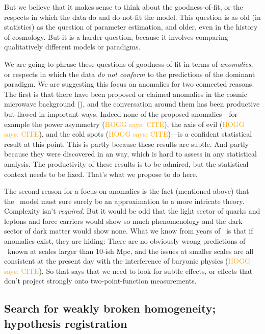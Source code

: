 \documentclass[12pt, fullpage, letterpaper]{article}
\newcommand{\HOGG}[1]{\textcolor{orange}{HOGG says: #1}}
\begin{document}
But we believe that it makes sense to think about the goodness-of-fit,
or the respects in which the data do and do not fit the model.
This question is as old (in statistics) as the question of parameter
estimation, and older, even in the history of cosmology.
But it is a harder question, because it involves comparing
qualitatively different models or paradigms.

We are going to phrase these questions of goodness-of-fit in terms of
\emph{anomalies}, or respects in which the data \emph{do not conform}
to the predictions of the dominant paradigm.
We are suggesting this focus on anomalies for two connected reasons.
The first is that there have been proposed or claimed anomalies in the
cosmic microwave background (\CMB), and the conversation around them has been
productive but flawed in important ways.
Indeed none of the proposed anomalies---for example the power
asymmetry (\HOGG{CITE}), the axis of evil (\HOGG{CITE}), and the cold
spots (\HOGG{CITE})---is a confident statistical result at this point.
This is partly because these results are subtle. And partly because
they were discovered in an  way, which is hard to
assess in any  statistical analysis.
The productivity of these results is to be admired, but the statistical
context needs to be fixed. That's what we propose to do here.

The second reason for a focus on anomalies is the fact (mentioned
above) that the \LCDM\ model must sure surely be an approximation to a
more intricate theory.
Complexity isn't \emph{required}.
But it would be odd that the light sector of quarks and leptons and
force carriers would show so much phenomenology and the dark sector of
dark matter would show none.
What we know from years of \LCDM\ is that if anomalies exist, they are
hiding: There are no obviously wrong predictions of \LCDM\ known at
scales larger than 10-ish Mpc, and the issues at smaller scales are
all consistent at the present day with the interference of baryonic
physics (\HOGG{CITE}).
So that says that we need to look for subtle effects, or effects that
don't project strongly onto two-point-function measurements.

\subsection{Search for weakly broken homogeneity; hypothesis registration}
\end{document}
